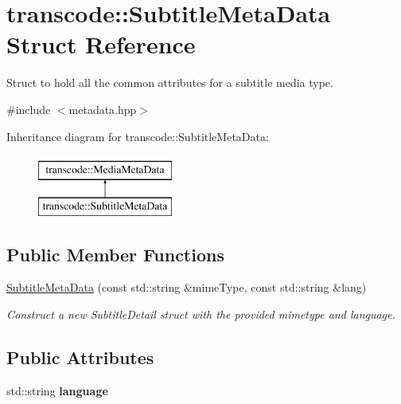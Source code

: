 \hypertarget{structtranscode_1_1SubtitleMetaData}{
\section{transcode::SubtitleMetaData Struct Reference}
\label{structtranscode_1_1SubtitleMetaData}
}


Struct to hold all the common attributes for a subtitle media type.  




{\ttfamily \#include $<$metadata.hpp$>$}

Inheritance diagram for transcode::SubtitleMetaData:\begin{figure}[H]
\begin{center}
\leavevmode
\includegraphics[height=2.000000cm]{structtranscode_1_1SubtitleMetaData}
\end{center}
\end{figure}
\subsection*{Public Member Functions}
\begin{DoxyCompactItemize}
\item 
\hyperlink{structtranscode_1_1SubtitleMetaData_a28480e38e52a8a2bf854399cbe06319c}{SubtitleMetaData} (const std::string \&mimeType, const std::string \&lang)
\begin{DoxyCompactList}\small\item\em Construct a new SubtitleDetail struct with the provided mimetype and language. \item\end{DoxyCompactList}\end{DoxyCompactItemize}
\subsection*{Public Attributes}
\begin{DoxyCompactItemize}
\item 
\hypertarget{structtranscode_1_1SubtitleMetaData_a094a13369e4095c16b7acc08702f7be5}{
std::string {\bfseries language}}
\label{structtranscode_1_1SubtitleMetaData_a094a13369e4095c16b7acc08702f7be5}

\end{DoxyCompactItemize}


